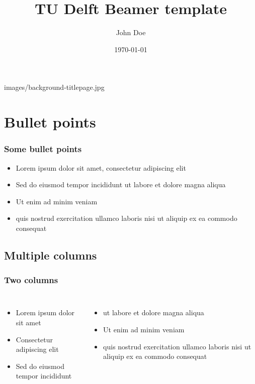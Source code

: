 \documentclass[aspectratio=169, bigger, t]{beamer}
\title[TU Delft Beamer template]{TU Delft Beamer template}
\institute[TU Delft]{Some interesting subtitle\hspace{2cm}}
\author{John Doe}
\date{\today}
\begin{document}
  \begin{titleframe}{images/background-titlepage.jpg}
    \titlepage
  \end{titleframe}

  {
    \nofootline
    \begin{frame}\frametitle{\titleTOC}
    	\tableofcontents
    \end{frame}
  }

  \section{Bullet points}
    \begin{frame}\frametitle{Some bullet points}
      \begin{itemize}
        \item Lorem ipsum dolor sit amet, consectetur adipiscing elit
        \item Sed do eiusmod tempor incididunt ut labore et dolore magna aliqua
        \item Ut enim ad minim veniam
        \item quis nostrud exercitation ullamco laboris nisi ut aliquip ex ea commodo consequat
      \end{itemize}
    \end{frame}


    \subsection{Multiple columns}
      \begin{frame}\frametitle{Two columns}
        \begin{columns}[onlytextwidth,T]
          \column{45mm}
          \begin{itemize}
            \item Lorem ipsum dolor sit amet
            \item Consectetur adipiscing elit
            \item Sed do eiusmod tempor incididunt
          \end{itemize}

          \column{\dimexpr\linewidth-45mm-5mm}
          \begin{itemize}
            \item ut labore et dolore magna aliqua
            \item Ut enim ad minim veniam
            \item quis nostrud exercitation ullamco laboris nisi ut aliquip ex ea commodo consequat
          \end{itemize}
        \end{columns}
      \end{frame}
\end{document}
